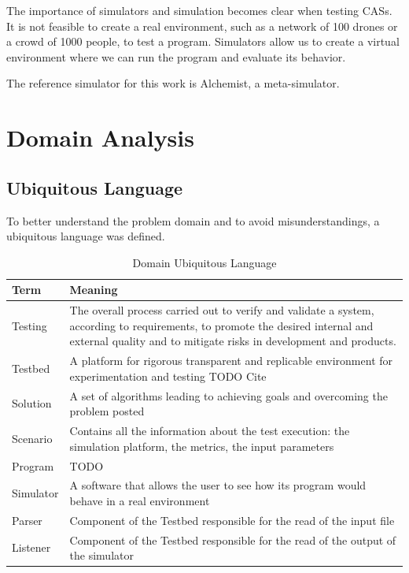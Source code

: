 \documentclass[12pt,a4paper,openright,twoside]{book}
\begin{document}
The importance of simulators and simulation becomes clear when testing CASs. 
It is not feasible to create a real environment, such as a network of 100 drones or a crowd of 1000 people, to test a program. 
Simulators allow us to create a virtual environment where we can run the program and evaluate its behavior.

The reference simulator for this work is Alchemist, a meta-simulator.


\chapter{Domain Analysis}

\section{Ubiquitous Language}

To better understand the problem domain and to avoid misunderstandings, a ubiquitous language was defined.

\begin{table}[h]
    \centering
    \begin{tabular}{|l|p{}|}
    \toprule
    \textbf{Term} & \textbf{Meaning} \\
    \midrule                                                                                                                                                              
    Testing & The overall process carried out to verify and validate a system, according to requirements, to promote the desired internal and external quality and to mitigate risks in development and products. \\ \hline
    Testbed & A platform for rigorous transparent and replicable environment for experimentation and testing TODO Cite \\ \hline
    Solution & A set of algorithms leading to achieving goals and overcoming the problem posted \\ \hline
    Scenario & Contains all the information about the test execution: the simulation platform, the metrics, the input parameters \\ \hline
    Program & TODO \\ \hline
    Simulator & A software that allows the user to see how its program would behave in a real environment \\ \hline
    Parser & Component of the Testbed responsible for the read of the input file \\ \hline
    Listener & Component of the Testbed responsible for the read of the output of the simulator \\ \hline
    \end{tabular}
    \caption{Domain Ubiquitous Language}
    \end{table}
\end{document}
